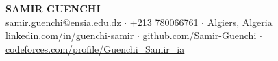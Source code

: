 \documentclass[8pt, letterpaper]{extarticle}
\begin{document}
\begin{center}
    {\fontsize{20}{24}\selectfont\bfseries\color{accent} SAMIR GUENCHI} \\[4pt]
    {\small
      \;\href{mailto:samir.guenchi@ensia.edu.dz}{samir.guenchi@ensia.edu.dz}
      \quad\textcolor{rulecolor}{$\boldsymbol{\cdot}$}\quad
      \;+213 780066761
      \quad\textcolor{rulecolor}{$\boldsymbol{\cdot}$}\quad
      \;Algiers, Algeria
    }\\[2pt]
    {\small
      \;\href{https://linkedin.com/in/guenchi-samir}{linkedin.com/in/guenchi-samir}
      \quad\textcolor{rulecolor}{$\boldsymbol{\cdot}$}\quad
      \;\href{https://github.com/Samir-Guenchi}{github.com/Samir-Guenchi}
      \quad\textcolor{rulecolor}{$\boldsymbol{\cdot}$}\quad
      \;\href{https://codeforces.com/profile/Guenchi_Samir_ia}{codeforces.com/profile/Guenchi\_Samir\_ia}
    }
\end{center}
\vspace{2pt}
\end{document}
